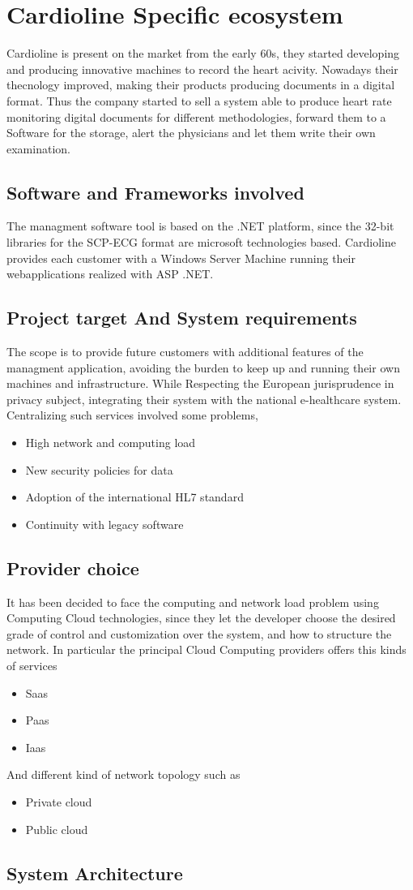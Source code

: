 \chapter{Cardioline Specific ecosystem}
Cardioline is present on the market from the early 60s, they started developing and producing innovative machines to record the heart acivity. Nowadays their thecnology improved, making their products producing documents in a digital format.
Thus the company started to sell a system able to produce heart rate monitoring digital documents for different methodologies, forward them to a Software for the storage, alert the physicians and let them write their own examination.
\section{Software and Frameworks involved}
The managment software tool is based on the .NET platform, since the 32-bit libraries for the SCP-ECG format are microsoft technologies based.
Cardioline provides each customer with a Windows Server Machine running their webapplications realized with ASP .NET.
\section{Project target And System requirements}
The scope is to provide future customers with additional features of the managment application, avoiding the burden to keep up and running their own machines and infrastructure.
While Respecting the European jurisprudence in privacy subject, integrating their system with the national e-healthcare system.
Centralizing such services involved some problems,
\begin{itemize}
    \item High network and computing load
    \item New security policies for data
    \item Adoption of the international HL7 standard
    \item Continuity with legacy software
\end{itemize}
\section{Provider choice}
It has been decided to face the computing and network load problem using Computing Cloud technologies, since they let the developer choose the desired grade of control and customization over the system, and how to structure the network.
In particular the principal Cloud Computing providers offers this kinds of services
\begin{itemize}
    \item Saas
    \item Paas
    \item Iaas
\end{itemize}
And different kind of network topology such as
\begin{itemize}
    \item Private cloud
    \item Public cloud
\end{itemize}

\section{System Architecture}
